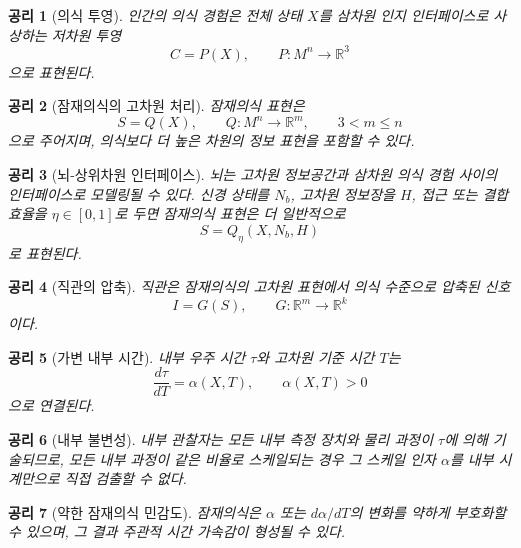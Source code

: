 \documentclass[11pt]{article}
\newtheorem{axiom}{공리}
\theoremstyle{remark}
\begin{document}
\begin{axiom}[의식 투영]
인간의 의식 경험은 전체 상태 $X$를 삼차원 인지 인터페이스로 사상하는
저차원 투영
\begin{equation}
  C = P(X), \qquad P:M^n \to \mathbb{R}^3
\end{equation}
으로 표현된다.
\end{axiom}

\begin{axiom}[잠재의식의 고차원 처리]
잠재의식 표현은
\begin{equation}
  S = Q(X), \qquad Q:M^n \to \mathbb{R}^m,\qquad 3<m\le n
\end{equation}
으로 주어지며, 의식보다 더 높은 차원의 정보 표현을 포함할 수 있다.
\end{axiom}

\begin{axiom}[뇌-상위차원 인터페이스]
뇌는 고차원 정보공간과 삼차원 의식 경험 사이의 인터페이스로 모델링될 수
있다. 신경 상태를 $N_b$, 고차원 정보장을 $H$, 접근 또는 결합 효율을
$\eta\in[0,1]$로 두면 잠재의식 표현은 더 일반적으로
\begin{equation}
  S = Q_\eta(X,N_b,H)
\end{equation}
로 표현된다.
\end{axiom}

\begin{axiom}[직관의 압축]
직관은 잠재의식의 고차원 표현에서 의식 수준으로 압축된 신호
\begin{equation}
  I = G(S), \qquad G:\mathbb{R}^m \to \mathbb{R}^k
\end{equation}
이다.
\end{axiom}

\begin{axiom}[가변 내부 시간]
내부 우주 시간 $\tau$와 고차원 기준 시간 $T$는
\begin{equation}
  \frac{d\tau}{dT} = \alpha(X,T), \qquad \alpha(X,T)>0
\end{equation}
으로 연결된다.
\end{axiom}

\begin{axiom}[내부 불변성]
내부 관찰자는 모든 내부 측정 장치와 물리 과정이 $\tau$에 의해 기술되므로,
모든 내부 과정이 같은 비율로 스케일되는 경우 그 스케일 인자 $\alpha$를
내부 시계만으로 직접 검출할 수 없다.
\end{axiom}

\begin{axiom}[약한 잠재의식 민감도]
잠재의식은 $\alpha$ 또는 $d\alpha/dT$의 변화를 약하게 부호화할 수 있으며,
그 결과 주관적 시간 가속감이 형성될 수 있다.
\end{axiom}
\end{document}
